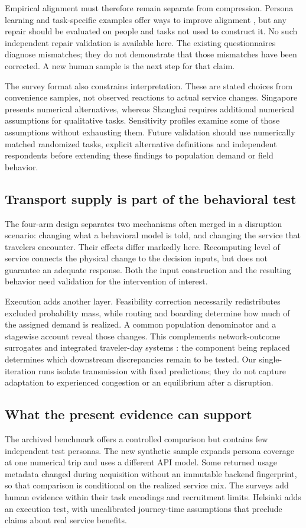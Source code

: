Empirical alignment must therefore remain separate from compression. Persona learning and task-specific examples offer ways to improve alignment \citep{liu2026persona,xu2026satisfaction}, but any repair should be evaluated on people and tasks not used to construct it. No such independent repair validation is available here. The existing questionnaires diagnose mismatches; they do not demonstrate that those mismatches have been corrected. A new human sample is the next step for that claim.

The survey format also constrains interpretation. These are stated choices from convenience samples, not observed reactions to actual service changes. Singapore presents numerical alternatives, whereas Shanghai requires additional numerical assumptions for qualitative tasks. Sensitivity profiles examine some of those assumptions without exhausting them. Future validation should use numerically matched randomized tasks, explicit alternative definitions and independent respondents before extending these findings to population demand or field behavior.

\subsection{Transport supply is part of the behavioral test}
The four-arm design separates two mechanisms often merged in a disruption scenario: changing what a behavioral model is told, and changing the service that travelers encounter. Their effects differ markedly here. Recomputing level of service connects the physical change to the decision inputs, but does not guarantee an adequate response. Both the input construction and the resulting behavior need validation for the intervention of interest.

Execution adds another layer. Feasibility correction necessarily redistributes excluded probability mass, while routing and boarding determine how much of the assigned demand is realized. A common population denominator and a stagewise account reveal those changes. This complements network-outcome surrogates \citep{natterer2025surrogates} and integrated traveler-day systems \citep{cheng2026calm}: the component being replaced determines which downstream discrepancies remain to be tested. Our single-iteration runs isolate transmission with fixed predictions; they do not capture adaptation to experienced congestion or an equilibrium after a disruption.

\subsection{What the present evidence can support}
The archived benchmark offers a controlled comparison but contains few independent test personas. The new synthetic sample expands persona coverage at one numerical trip and uses a different API model. Some returned usage metadata changed during acquisition without an immutable backend fingerprint, so that comparison is conditional on the realized service mix. The surveys add human evidence within their task encodings and recruitment limits. Helsinki adds an execution test, with uncalibrated journey-time assumptions that preclude claims about real service benefits.


